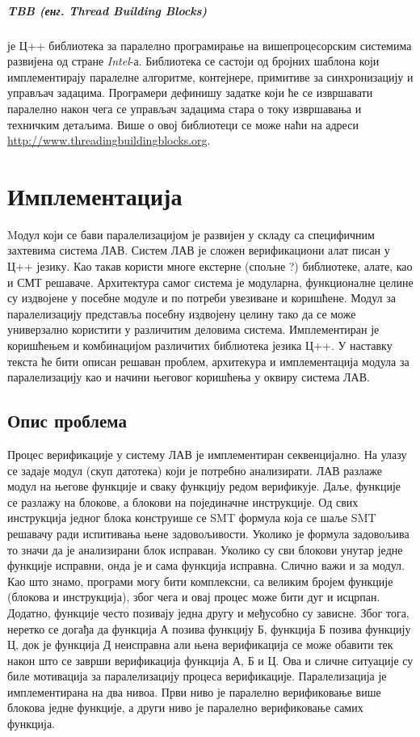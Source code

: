 \documentclass[12pt,oneside]{memoir}
\begin{document}
\paragraph{TBB (енг. Thread Building Blocks)} је Ц++ библиотека за паралелно програмирање на вишепроцесорским системима развијена од стране \emph{Intel}-а. Библиотека се састоји од бројних шаблона који имплементирају паралелне алгоритме, контејнере, примитиве за синхронизацију и управљач задацима. Програмери дефинишу задатке који ће се извршавати паралелно након чега се управљач задацима стара о току извршавања и техничким детаљима. Више о овој библиотеци се може наћи на адреси \url{http://www.threadingbuildingblocks.org}.


  
\chapter{Имплементација}
Mодул који се бави паралелизацијом је развијен у складу са специфичним захтевима система ЛАВ. Систем ЛАВ је сложен верификациони алат писан у Ц++ језику. Као такав користи многе екстерне (спољне ?) библиотеке, алате, као и СМТ решаваче.  Архитектура самог система је модуларна, функционалне целине су издвојене у посебне модуле и по потреби увезиване и коришћене. Модул за паралелизацију представља посебну издвојену целину тако да се може универзално користити у различитим деловима система. Имплементиран је коришћењем  и комбинацијом различитих библиотека језика Ц++.   У наставку текста ће бити описан решаван проблем, архитекура и имплементација модула за паралелизацију као и начини његовог коришћења у оквиру система ЛАВ.

\section{Опис проблема}
Процес верификације у систему ЛАВ је имплементиран секвенцијално. На улазу се задаје модул (скуп датотека) који је потребно анализирати.  ЛАВ разлаже модул на његове функције и сваку функцију редом верификује. Даље, функције се разлажу на блокове, а блокови на појединачне инструкције. Од свих инструкција једног блока конструише се SMT формула која се шаље SMT решавачу ради испитивања њене задовољивости. Уколико је формула задовољива то значи да је анализирани блок исправан. Уколико су сви блокови унутар једне функције исправни, онда је и сама функција исправна. Слично важи и за модул. Као што знамо, програми могу бити комплексни, са великим бројем функције (блокова и инструкција), због чега и овај процес може бити дуг и исцрпан. Додатно, функције често позивају једна другу и међусобно су зависне. Због тога, неретко се догађа да функција А позива функцију Б, функција Б позива функцију Ц, док је функција Д неисправна али њена верификација се може обавити тек након што се заврши верификација функција А, Б и Ц. Ова и сличне ситуације су биле мотивација за паралелизацију процеса верификације. Паралелизација је имплементирана на два нивоа. Први ниво је паралелно верификовање више блокова једне функције, а други ниво је паралелно верификовање самих функција.
\end{document}
